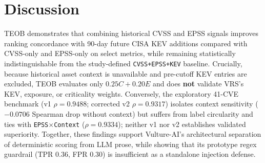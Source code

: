 \documentclass[conference]{IEEEtran}
\begin{document}
\begin{table}[t]
\centering
\caption{Score-integrity simulation (5 stub-LLM payloads). Source: \texttt{experiments/revision/guardrail/score\_integrity.json}.}
\label{tab:integrity}
\end{table}

\section{Discussion}
TEOB demonstrates that combining historical CVSS and EPSS signals improves ranking concordance with 90-day future CISA KEV additions compared with CVSS-only and EPSS-only on select metrics, while remaining statistically indistinguishable from the study-defined \texttt{CVSS+EPSS+KEV} baseline. Crucially, because historical asset context is unavailable and pre-cutoff KEV entries are excluded, TEOB evaluates only $0.25C + 0.20E$ and does \textbf{not} validate VRS's KEV, exposure, or criticality weights. Conversely, the exploratory 41-CVE benchmark (v1 $\rho=0.9488$; corrected v2 $\rho=0.9317$) isolates context sensitivity ($-0.0706$ Spearman drop without context) but suffers from label circularity and ties with \texttt{EPSS$\times$Context} ($\rho=0.9334$); neither v1 nor v2 establishes validated superiority. Together, these findings support Vulture-AI's architectural separation of deterministic scoring from LLM prose, while showing that its prototype regex guardrail (TPR 0.36, FPR 0.30) is insufficient as a standalone injection defense.
\end{document}
